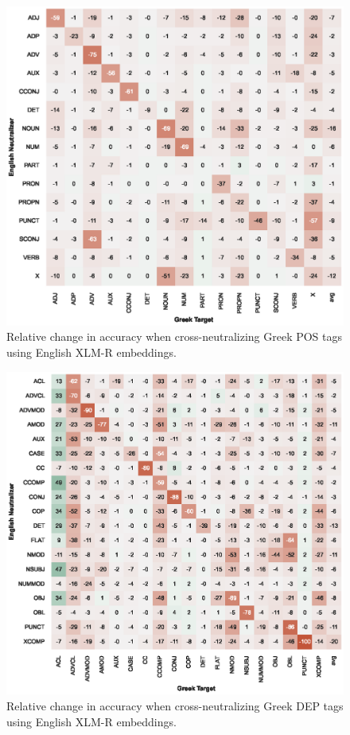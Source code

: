 \documentclass[11pt,a4paper]{article}
\begin{document}
\begin{figure}[t]
    \centering
    \includegraphics{full_figures/POS-crosslingual-el_gdt_from_en_gum-accdrop.eps}
    \caption{Relative change in accuracy when cross-neutralizing Greek POS tags using English XLM-R embeddings.}
    \label{fig:xlingual_xneutr_pos_el_gdt_from_en_gum}
\end{figure}

\begin{figure}[t]
    \centering
    \includegraphics{full_figures/DEP-crosslingual-el_gdt_from_en_gum-accdrop.eps}
    \caption{Relative change in accuracy when cross-neutralizing Greek DEP tags using English XLM-R embeddings.}
    \label{fig:xlingual_xneutr_dep_el_gdt_from_en_gum}
\end{figure}
\end{document}
